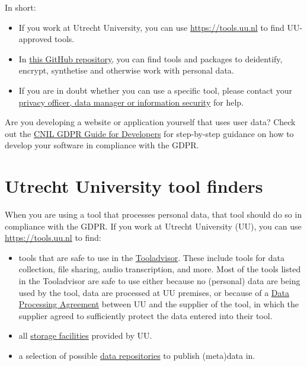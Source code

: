 \documentclass[
]{book}
\providecommand{\tightlist}{%
  \setlength{\itemsep}{0pt}\setlength{\parskip}{0pt}}
\begin{document}
In short:

\begin{itemize}
\tightlist
\item
  If you work at Utrecht University, you can use \url{https://tools.uu.nl} to find UU-approved tools.
\item
  In \href{https://github.com/UtrechtUniversity/privacy-engineering-tools/}{this GitHub repository},
  you can find tools and packages to deidentify, encrypt, synthetise and otherwise
  work with personal data.
\item
  If you are in doubt whether you can use a specific tool, please contact your
  \protect\hyperlink{support}{privacy officer, data manager or information security} for help.
\end{itemize}

Are you developing a website or application yourself that uses user data? Check
out the \href{https://lincnil.github.io/GDPR-Developer-Guide/}{CNIL GDPR Guide for Developers}
for step-by-step guidance on how to develop your software in compliance with the GDPR.

\hypertarget{uu-tools}{%
\section{Utrecht University tool finders}\label{uu-tools}}

When you are using a tool that processes personal data, that tool should do so
in compliance with the GDPR. If you work at Utrecht University (UU), you can use
\url{https://tools.uu.nl} to find:

\begin{itemize}
\tightlist
\item
  tools that are safe to use in the \href{https://tools.uu.nl/tooladvisor}{Tooladvisor}.
  These include tools for data collection, file sharing, audio transcription, and more.
  Most of the tools listed in the Tooladvisor are safe to use either because no (personal)
  data are being used by the tool, data are processed at UU premises, or because
  of a \protect\hyperlink{data-processing-agreement}{Data Processing Agreement} between
  UU and the supplier of the tool, in which the supplier agreed to
  sufficiently protect the data entered into their tool.
\item
  all \href{https://tools.uu.nl/storagefinder/}{storage facilities}
  provided by UU.
\item
  a selection of possible \href{https://tools.uu.nl/repository-decision-tool/}{data repositories}
  to publish (meta)data in.
\end{itemize}
\end{document}
